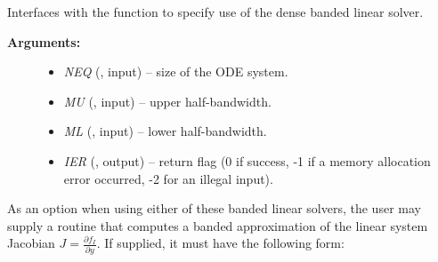 \documentclass[letterpaper,10pt,english]{sphinxmanual}
\begin{document}
\begin{fulllineitems}
\label{f_interface/Usage:f/_/FARKLAPACKBAND}
Interfaces with the {\hyperref[c_interface/User_callable:ARKLapackBand]{}} function
to specify use of the dense banded linear solver.
\begin{description}
\item[{\textbf{Arguments:}}] \leavevmode\begin{itemize}
\item {} 
\emph{NEQ} (, input) -- size of the ODE system.

\item {} 
\emph{MU} (, input) -- upper half-bandwidth.

\item {} 
\emph{ML} (, input) -- lower half-bandwidth.

\item {} 
\emph{IER} (, output) -- return flag (0 if success, -1 if a memory allocation
error occurred, -2 for an illegal input).

\end{itemize}

\end{description}

\end{fulllineitems}


As an option when using either of these banded linear solvers, the user
may supply a routine that computes a banded approximation of the
linear system Jacobian $J = \frac{\partial f_I}{\partial y}$. If
supplied, it must have the following form:
\end{document}
